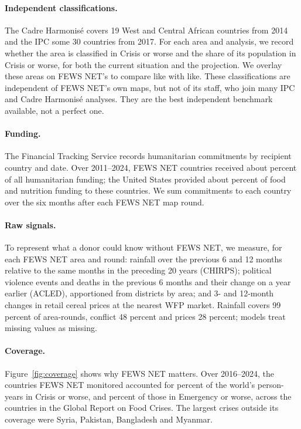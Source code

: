 \documentclass[11pt]{article}
\begin{document}
\paragraph{Independent classifications.} The Cadre Harmonis\'e covers 19 West and Central African countries from 2014 and the IPC some 30 countries from 2017. For each area and analysis, we record whether the area is classified in Crisis or worse and the share of its population in Crisis or worse, for both the current situation and the projection. We overlay these areas on FEWS NET's to compare like with like. These classifications are independent of FEWS NET's own maps, but not of its staff, who join many IPC and Cadre Harmonis\'e analyses. They are the best independent benchmark available, not a perfect one.

\paragraph{Funding.} The Financial Tracking Service records humanitarian commitments by recipient country and date. Over 2011--2024, FEWS NET countries received about \ftsShareFews{} percent of all humanitarian funding; the United States provided about \ftsUsFoodShare{} percent of food and nutrition funding to these countries. We sum commitments to each country over the six months after each FEWS NET map round.

\paragraph{Raw signals.} To represent what a donor could know without FEWS NET, we measure, for each FEWS NET area and round: rainfall over the previous 6 and 12 months relative to the same months in the preceding 20 years (CHIRPS); political violence events and deaths in the previous 6 months and their change on a year earlier (ACLED), apportioned from districts by area; and 3- and 12-month changes in retail cereal prices at the nearest WFP market. Rainfall covers 99 percent of area-rounds, conflict 48 percent and prices 28 percent; models treat missing values as missing.

\paragraph{Coverage.} Figure~\ref{fig:coverage} shows why FEWS NET matters. Over 2016--2024, the countries FEWS NET monitored accounted for \covPthree{} percent of the world's person-years in Crisis or worse, and \covPfour{} percent of those in Emergency or worse, across the \covCountries{} countries in the Global Report on Food Crises. The largest crises outside its coverage were Syria, Pakistan, Bangladesh and Myanmar.
\end{document}
